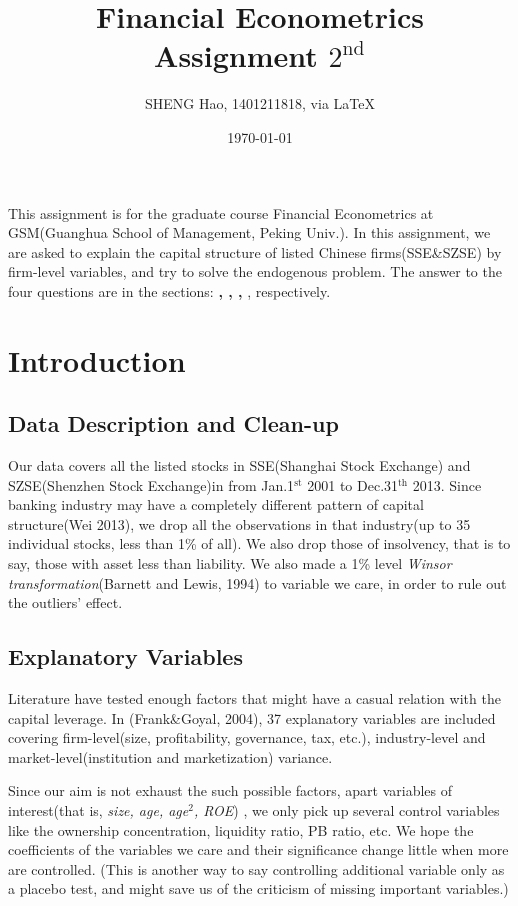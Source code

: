 \documentclass{article}
\begin{document}
\title{Financial Econometrics\\Assignment $2^{\text{nd}}$}
\author{{\normalsize SHENG Hao, 1401211818, via \LaTeX}}
\date{\today}

\maketitle

\def \Pr{{\rm Pr}}
\baselineskip 0.6cm

 This assignment is for the graduate course Financial Econometrics at GSM(Guanghua School of Management, Peking Univ.). In this assignment, we are asked to explain the capital structure of listed Chinese firms(SSE\&SZSE) by firm-level variables, and try to solve the endogenous problem. The answer to the four questions are in the sections: {\bf {}, , , }, respectively.


\section{Introduction}
\subsection{Data Description and Clean-up}
Our data covers all the listed stocks in SSE(Shanghai Stock Exchange) and SZSE(Shenzhen Stock Exchange)in from Jan.1$^{\text{st}}$ 2001 to Dec.31$^{\text{th}}$ 2013. Since banking industry may have a completely different pattern of capital structure(Wei 2013), we drop all the observations in that industry(up to 35 individual stocks, less than 1\% of all). We also drop those of insolvency, that is to say, those with asset less than liability. We also made a 1\% level {\it Winsor transformation}(Barnett and Lewis, 1994) to variable we care, in order to rule out the outliers' effect.

\subsection{Explanatory Variables}
Literature have tested enough factors that might have a casual relation with the capital leverage. In (Frank\&Goyal, 2004), 37 explanatory variables are included covering firm-level(size, profitability, governance, tax, etc.), industry-level and market-level(institution and marketization) variance.

Since our aim is not exhaust the such possible factors, apart variables of interest(that is, {\it size, age, age$^2$, ROE}) , we only pick up several control variables like the ownership concentration, liquidity ratio, PB ratio, etc. We hope the coefficients of the variables we care and their significance change little when more are controlled. (This is another way to say controlling additional variable only        as a placebo test, and might save us of the criticism of missing important variables.)
\end{document}
